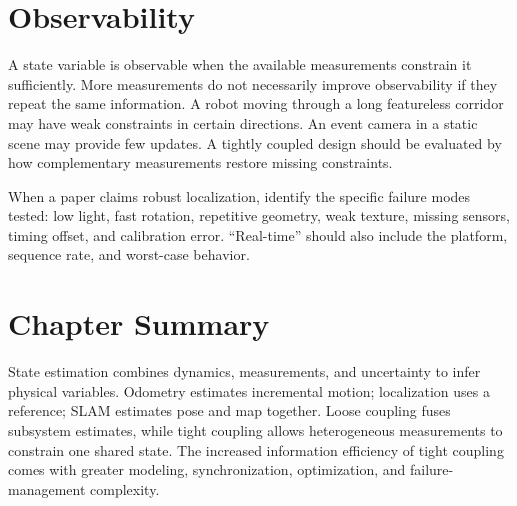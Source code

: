 \section{Observability}

A state variable is observable when the available measurements constrain it sufficiently. More measurements do not necessarily improve observability if they repeat the same information. A robot moving through a long featureless corridor may have weak constraints in certain directions. An event camera in a static scene may provide few updates. A tightly coupled design should be evaluated by how complementary measurements restore missing constraints.

\begin{engineeringcheck}
When a paper claims robust localization, identify the specific failure modes tested: low light, fast rotation, repetitive geometry, weak texture, missing sensors, timing offset, and calibration error. ``Real-time'' should also include the platform, sequence rate, and worst-case behavior.
\end{engineeringcheck}

\section{Chapter Summary}

State estimation combines dynamics, measurements, and uncertainty to infer physical variables. Odometry estimates incremental motion; localization uses a reference; SLAM estimates pose and map together. Loose coupling fuses subsystem estimates, while tight coupling allows heterogeneous measurements to constrain one shared state. The increased information efficiency of tight coupling comes with greater modeling, synchronization, optimization, and failure-management complexity.
